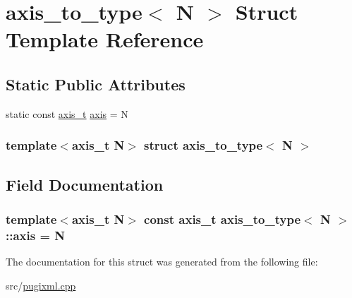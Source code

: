 \hypertarget{structaxis__to__type}{
\section{axis\_\-to\_\-type$<$ N $>$ Struct Template Reference}
\label{structaxis__to__type}
}
\subsection*{Static Public Attributes}
\begin{DoxyCompactItemize}
\item 
static const \hyperlink{pugixml_8cpp_ae7747145441b0591a5c04f20f6f9189a}{axis\_\-t} \hyperlink{structaxis__to__type_ac9d75681918ad98c980db0f49b570b50}{axis} = N
\end{DoxyCompactItemize}
\subsubsection*{template$<$axis\_\-t N$>$ struct axis\_\-to\_\-type$<$ N $>$}



\subsection{Field Documentation}
\hypertarget{structaxis__to__type_ac9d75681918ad98c980db0f49b570b50}{
\subsubsection[{axis}]{\setlength{\rightskip}{0pt plus 5cm}template$<$axis\_\-t N$>$ const {\bf axis\_\-t} {\bf axis\_\-to\_\-type}$<$ N $>$::{\bf axis} = N}}
\label{structaxis__to__type_ac9d75681918ad98c980db0f49b570b50}


The documentation for this struct was generated from the following file:\begin{DoxyCompactItemize}
\item 
src/\hyperlink{pugixml_8cpp}{pugixml.cpp}\end{DoxyCompactItemize}
